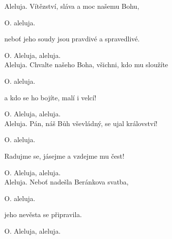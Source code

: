 
Aleluja.
Vítězství, sláva a moc našemu Bohu, 

O. aleluja.

neboť jeho soudy jsou pravdivé a spravedlivé. 

O. Aleluja, aleluja.\\

Aleluja. 
Chvalte našeho Boha, všichni, kdo mu sloužíte 

O. aleluja.

a kdo se ho bojíte, malí i velcí! 

O. Aleluja, aleluja.\\

Aleluja. 
Pán, náš Bůh vševládný, se ujal království! 

O. aleluja.

Radujme se, jásejme a vzdejme mu čest! 

O. Aleluja, aleluja.\\

Aleluja. 
Neboť nadešla Beránkova svatba, 

O. aleluja.

jeho nevěsta se připravila. 

O. Aleluja, aleluja. 
